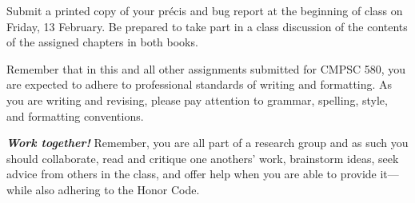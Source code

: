 Submit a printed copy of your pr\'{e}cis and bug report at the beginning of class on Friday, 13 February. Be prepared to
take part in a class discussion of the contents of the assigned chapters in both books.

Remember that in this and all other assignments submitted for CMPSC 580, you are expected to adhere to professional
standards of writing and formatting. As you are writing and revising, please pay attention to grammar, spelling, style,
and formatting conventions.

{\large\color{black}\textbf{\textit{Work together!}}} Remember, you are all part of a research group and as such you
should collaborate, read and critique one anothers' work, brainstorm ideas, seek advice from others in the class, and offer
help when you are able to provide it---while also adhering to the Honor Code.


